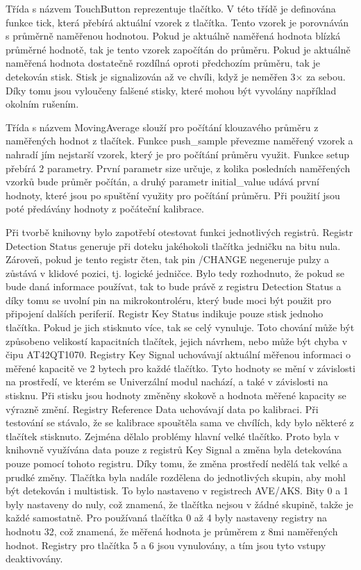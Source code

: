 Třída s názvem TouchButton reprezentuje tlačítko. V této třídě je definována funkce tick, která přebírá aktuální vzorek z tlačítka. Tento vzorek je porovnáván s průměrně naměřenou hodnotou. Pokud 
je aktuálně naměřená hodnota blízká průměrné hodnotě, tak je tento vzorek započítán do průměru. Pokud je aktuálně naměřená hodnota dostatečně rozdílná oproti předchozím průměru, tak je detekován stisk. 
Stisk je signalizován až ve chvíli, když je neměřen 3$\times$ za sebou. Díky tomu jsou vyloučeny falšené stisky, které mohou být vyvolány například okolním rušením.  

Třída s názvem MovingAverage slouží pro počítání klouzavého průměru z naměřených hodnot z tlačítek. Funkce push\_sample převezme naměřený vzorek a nahradí jím nejstarší vzorek, který je pro počítání 
průměru využit. Funkce setup přebírá 2 parametry. První parametr size určuje, z kolika posledních naměřených vzorků bude průměr počítán, a druhý parametr initial\_value udává první hodnoty, které 
jsou po spuštění využity pro počítání průměru. Při použití jsou poté předávány hodnoty z počáteční kalibrace. 

Při tvorbě knihovny bylo zapotřebí otestovat funkci jednotlivých registrů. Registr Detection Status generuje při doteku jakéhokoli tlačítka jedničku na bitu nula. Zároveň, pokud je tento 
registr čten, tak pin /CHANGE negeneruje pulzy a zůstává v klidové pozici, tj. logické jedničce. Bylo tedy rozhodnuto, že pokud se bude daná informace používat, tak to bude právě z registru 
Detection Status a díky tomu se uvolní pin na mikrokontroléru, který bude moci být použit pro připojení dalších periferií. Registr Key Status indikuje pouze stisk jednoho tlačítka. Pokud 
je jich stisknuto více, tak se celý vynuluje. Toto chování může být způsobeno velikostí kapacitních tlačítek, jejich návrhem, nebo může být chyba v čipu AT42QT1070. Registry Key Signal 
uchovávají aktuální měřenou informaci o měřené kapacitě ve 2 bytech pro každé tlačítko. Tyto hodnoty se mění v závislosti na prostředí, ve kterém se Univerzální modul nachází, a také v závislosti 
na stisknu. Při stisku jsou hodnoty změněny skokově a hodnota měřené kapacity se výrazně změní. 
Registry Reference Data uchovávají data po kalibraci. Při testování se stávalo, že se kalibrace spouštěla sama ve chvílích, kdy bylo některé z tlačítek stisknuto. Zejména dělalo problémy hlavní
velké tlačítko. Proto byla v knihovně využívána data pouze z registrů Key Signal a změna byla detekována pouze pomocí tohoto registru. Díky tomu, že změna prostředí nedělá tak velké a prudké 
změny. Tlačítka byla nadále rozdělena do jednotlivých skupin, aby mohl být detekován i multistisk. To bylo nastaveno v registrech AVE/AKS. Bity 0 a 1 byly nastaveny do nuly, což znamená, že 
tlačítka nejsou v žádné skupině, takže je každé samostatně. Pro používaná tlačítka 0 až 4 byly nastaveny registry na hodnotu 32, což znamená, že měřená hodnota je průměrem z 8mi naměřených
hodnot. Registry pro tlačítka 5 a 6 jsou vynulovány, a tím jsou tyto vstupy deaktivovány. 

